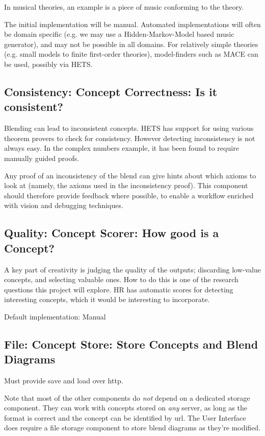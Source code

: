 \documentclass[a4paper,twoside,11pt]{article}
\begin{document}
In musical theories, an example is a piece of music conforming to the theory.
 
The initial implementation will be manual. Automated implementations will often be domain specific (e.g. we may use a Hidden-Markov-Model based music generator), and may not be possible in all domains.
For relatively simple theories (e.g. small models to finite first-order theories), model-finders such as MACE can be used, possibly via HETS.


\subsection{Consistency: Concept Correctness: Is it consistent?}

Blending can lead to inconsistent concepts. HETS has support for using various theorem provers to check for consistency. However detecting inconsistency is not always
easy. In the complex numbers example, it has been found to require manually guided
proofs.

Any proof of an inconsistency of the blend can give hints about which axioms to look at (namely, the axioms used in the inconsistency proof). This component should therefore provide feedback where possible, to enable a workflow enriched with vision and debugging techniques.

\subsection{Quality: Concept Scorer: How good is a Concept?}


A key part of creativity is judging the quality of the outputs; discarding
low-value concepts, and selecting valuable ones. How to do this is one of the research questions this project will explore. HR has automatic scores for detecting interesting concepts, which it would be interesting to incorporate.

Default implementation: Manual

\subsection{File: Concept Store: Store Concepts and Blend Diagrams}


Must provide save and load over http.

Note that most of the other components do {\em not} depend on a dedicated storage component. They can work with concepts stored on {\em any} server, as long as the format is correct and the concept can be identified by url. The User Interface does require a file storage component to store blend diagrams as they're modified.
\end{document}
